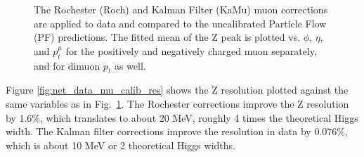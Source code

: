 \begin{figure}[!h]
  \caption[Rochester and Kalman Filter muon corrections on the Z peak mean in data.]
   {The Rochester (Roch) and Kalman Filter (KaMu) muon corrections are applied to data and compared to the uncalibrated Particle Flow (PF) predictions. The fitted mean of the Z peak is plotted  vs. $\phi$, $\eta$, and $p_{t}^\mu$ for the positively and negatively charged muon separately, and for dimuon $p_t$ as well.}
  \label{fig:net_data_mu_calib_mean}
\end{figure}
Figure \ref{fig:net_data_mu_calib_res} shows the Z resolution plotted against the same variables as in Fig.~\ref{fig:net_data_mu_calib_mean}. The Rochester corrections improve the Z resolution by 1.6\%, which translates to about 20 MeV, roughly 4 times the theoretical Higgs width. The Kalman filter corrections improve the resolution in data by 0.076\%, which is about 10 MeV or 2 theoretical Higgs widths.
